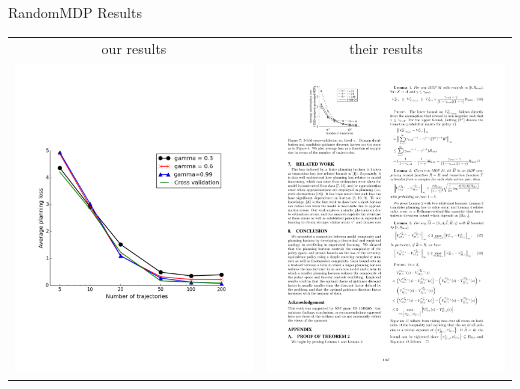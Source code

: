\documentclass{beamer}
\begin{document}
\begin{frame}{RandomMDP Results}
\begin{tabular}{cc}
our results & their results \\
	\includegraphics[page=1,height=.55\textheight,width=.5\textwidth]{../results/figure_2.pdf} &
	\includegraphics[page=1,width=.41\textwidth]{../results/originalCV.pdf}
\end{tabular}
\end{frame}
\end{document}

